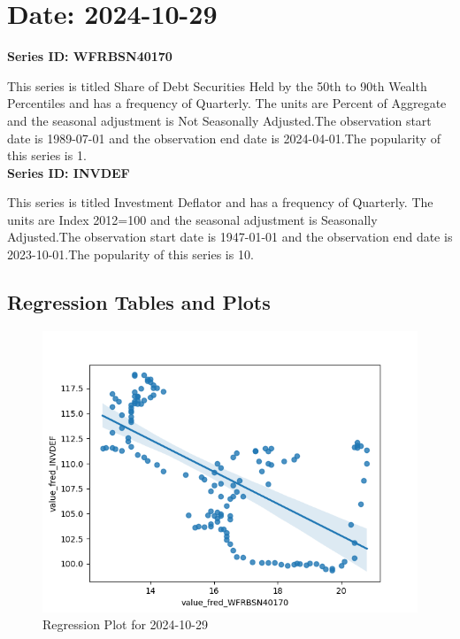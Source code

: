 \section{Date: 2024-10-29}
\noindent \textbf{Series ID: WFRBSN40170} 

\noindent This series is titled Share of Debt Securities Held by the 50th to 90th Wealth Percentiles and has a frequency of Quarterly. The units are Percent of Aggregate and the seasonal adjustment is Not Seasonally Adjusted.The observation start date is 1989-07-01 and the observation end date is 2024-04-01.The popularity of this series is 1. \\ 

\noindent \textbf{Series ID: INVDEF} 

\noindent This series is titled Investment Deflator and has a frequency of Quarterly. The units are Index 2012=100 and the seasonal adjustment is Seasonally Adjusted.The observation start date is 1947-01-01 and the observation end date is 2023-10-01.The popularity of this series is 10. \\ 

\subsection{Regression Tables and Plots}


\begin{figure}
\centering
\includegraphics[scale = 0.9]{plots/plot_2024-10-29.png}
\caption{Regression Plot for 2024-10-29}
\end{figure}
\newpage
